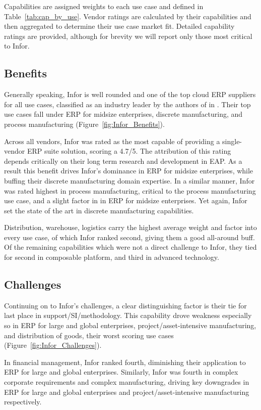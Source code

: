 \documentclass{article}
\begin{document}
Capabilities are assigned weights to each use case and defined in Table~\ref{tab:cap_by_use}.
Vendor ratings are calculated by their capabilities and then aggregated to determine their use case market fit.
Detailed capability ratings are provided, although for brevity we will report only those most critical to Infor.

\subsection{Benefits}

Generally speaking, Infor is well rounded and one of the top cloud ERP suppliers for all use cases, classified as an industry leader by the authors of \cite{critical_cloud_erp} in \cite{magic_cloud_erp}.
Their top use cases fall under ERP for midsize enterprises, discrete manufacturing, and process manufacturing (Figure~\ref{fig:Infor_Benefits}).

Across all vendors, Infor was rated as the most capable of providing a single-vendor ERP suite solution, scoring a 4.7/5.
The attribution of this rating depends critically on their long term research and development in EAP.
As a result this benefit drives Infor's dominance in ERP for midsize enterprises, while buffing their discrete manufacturing domain expertise.
In a similar manner, Infor was rated highest in process manufacturing, critical to the process manufacturing use case, and a slight factor in in ERP for midsize enterprises.
Yet again, Infor set the state of the art in discrete manufacturing capabilities.

Distribution, warehouse, logistics carry the highest average weight and factor into every use case, of which Infor ranked second, giving them a good all-around buff.
Of the remaining capabilities which were not a direct challenge to Infor, they tied for second in composable platform, and third in advanced technology.

\subsection{Challenges}
Continuing on to Infor's challenges, a clear distinguishing factor is their tie for last place in support/SI/methodology.
This capability drove weakness especially so in ERP for large and global enterprises, project/asset-intensive manufacturing, and distribution of goods, their worst scoring use cases (Figure~\ref{fig:Infor_Challenges}).

In financial management, Infor ranked fourth, diminishing their application to ERP for large and global enterprises.
Similarly, Infor was fourth in complex corporate requirements and complex manufacturing, driving key downgrades in ERP for large and global enterprises and project/asset-intensive manufacturing respectively.
\end{document}
